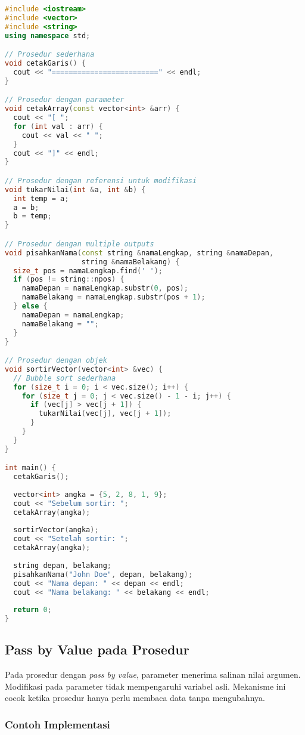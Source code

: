 \documentclass[../main.tex]{subfiles}
\begin{document}
\begin{lstlisting}[language=C++, caption={Definisi prosedur (C++)}]
#include <iostream>
#include <vector>
#include <string>
using namespace std;

// Prosedur sederhana
void cetakGaris() {
  cout << "=========================" << endl;
}

// Prosedur dengan parameter
void cetakArray(const vector<int> &arr) {
  cout << "[ ";
  for (int val : arr) {
    cout << val << " ";
  }
  cout << "]" << endl;
}

// Prosedur dengan referensi untuk modifikasi
void tukarNilai(int &a, int &b) {
  int temp = a;
  a = b;
  b = temp;
}

// Prosedur dengan multiple outputs
void pisahkanNama(const string &namaLengkap, string &namaDepan, 
                  string &namaBelakang) {
  size_t pos = namaLengkap.find(' ');
  if (pos != string::npos) {
    namaDepan = namaLengkap.substr(0, pos);
    namaBelakang = namaLengkap.substr(pos + 1);
  } else {
    namaDepan = namaLengkap;
    namaBelakang = "";
  }
}

// Prosedur dengan objek
void sortirVector(vector<int> &vec) {
  // Bubble sort sederhana
  for (size_t i = 0; i < vec.size(); i++) {
    for (size_t j = 0; j < vec.size() - 1 - i; j++) {
      if (vec[j] > vec[j + 1]) {
        tukarNilai(vec[j], vec[j + 1]);
      }
    }
  }
}

int main() {
  cetakGaris();
  
  vector<int> angka = {5, 2, 8, 1, 9};
  cout << "Sebelum sortir: ";
  cetakArray(angka);
  
  sortirVector(angka);
  cout << "Setelah sortir: ";
  cetakArray(angka);
  
  string depan, belakang;
  pisahkanNama("John Doe", depan, belakang);
  cout << "Nama depan: " << depan << endl;
  cout << "Nama belakang: " << belakang << endl;
  
  return 0;
}
\end{lstlisting}

\subsection{Pass by Value pada Prosedur}
Pada prosedur dengan \emph{pass by value}, parameter menerima salinan nilai argumen. Modifikasi pada parameter tidak mempengaruhi variabel asli. Mekanisme ini cocok ketika prosedur hanya perlu membaca data tanpa mengubahnya.

\subsubsection{Contoh Implementasi}
\end{document}
